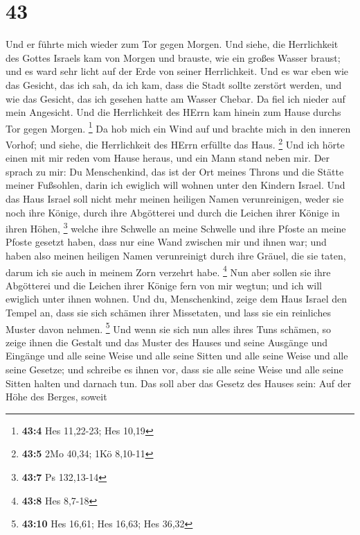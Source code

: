 \hypertarget{section-42}{%
\section{43}\label{section-42}}

 Und er führte mich wieder zum Tor gegen Morgen.
 Und siehe, die Herrlichkeit des Gottes Israels kam von
Morgen und brauste, wie ein großes Wasser braust; und es ward sehr licht
auf der Erde von seiner Herrlichkeit.  Und es war eben wie
das Gesicht, das ich sah, da ich kam, dass die Stadt sollte zerstört
werden, und wie das Gesicht, das ich gesehen hatte am Wasser Chebar. Da
fiel ich nieder auf mein Angesicht.  Und die Herrlichkeit
des HErrn kam hinein zum Hause durchs Tor gegen Morgen. \footnote{\textbf{43:4}
  Hes 11,22-23; Hes 10,19}  Da hob mich ein Wind auf und
brachte mich in den inneren Vorhof; und siehe, die Herrlichkeit des
HErrn erfüllte das Haus. \footnote{\textbf{43:5} 2Mo 40,34; 1Kö 8,10-11}
 Und ich hörte einen mit mir reden vom Hause heraus, und
ein Mann stand neben mir.  Der sprach zu mir: Du
Menschenkind, das ist der Ort meines Throns und die Stätte meiner
Fußsohlen, darin ich ewiglich will wohnen unter den Kindern Israel. Und
das Haus Israel soll nicht mehr meinen heiligen Namen verunreinigen,
weder sie noch ihre Könige, durch ihre Abgötterei und durch die Leichen
ihrer Könige in ihren Höhen, \footnote{\textbf{43:7} Ps 132,13-14}
 welche ihre Schwelle an meine Schwelle und ihre Pfoste an
meine Pfoste gesetzt haben, dass nur eine Wand zwischen mir und ihnen
war; und haben also meinen heiligen Namen verunreinigt durch ihre
Gräuel, die sie taten, darum ich sie auch in meinem Zorn verzehrt habe.
\footnote{\textbf{43:8} Hes 8,7-18}  Nun aber sollen sie
ihre Abgötterei und die Leichen ihrer Könige fern von mir wegtun; und
ich will ewiglich unter ihnen wohnen.  Und du,
Menschenkind, zeige dem Haus Israel den Tempel an, dass sie sich schämen
ihrer Missetaten, und lass sie ein reinliches Muster davon nehmen.
\footnote{\textbf{43:10} Hes 16,61; Hes 16,63; Hes 36,32}
 Und wenn sie sich nun alles ihres Tuns schämen, so zeige
ihnen die Gestalt und das Muster des Hauses und seine Ausgänge und
Eingänge und alle seine Weise und alle seine Sitten und alle seine Weise
und alle seine Gesetze; und schreibe es ihnen vor, dass sie alle seine
Weise und alle seine Sitten halten und darnach tun.  Das
soll aber das Gesetz des Hauses sein: Auf der Höhe des Berges, soweit
